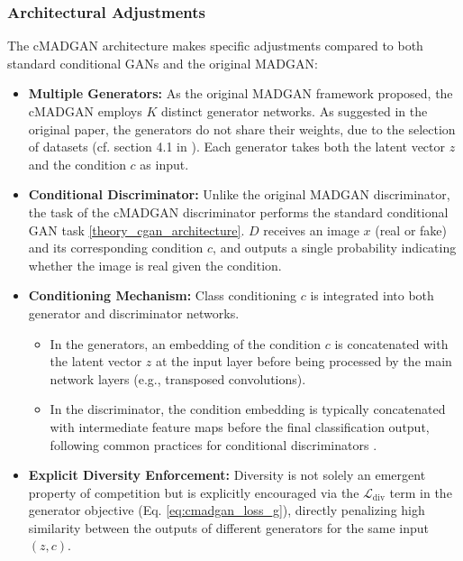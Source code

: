 \subsubsection{Architectural Adjustments}
\label{theory_cmadgan_architecture}

The cMADGAN architecture makes specific adjustments compared to both standard conditional GANs and the original MADGAN:

\begin{itemize}
    \item \textbf{Multiple Generators:}
    As the original MADGAN framework proposed, the \\cMADGAN employs $K$ distinct generator networks. As suggested in the original paper, the generators do not share their weights, due to the selection of datasets (cf. section 4.1 in \cite{ghosh2018madgan}). Each generator takes both the latent vector $z$ and the condition $c$ as input.
    \item \textbf{Conditional Discriminator:}
    Unlike the original MADGAN discriminator, the task of the cMADGAN discriminator performs the standard conditional GAN task \ref{theory_cgan_architecture}. $D$ receives an image $x$ (real or fake) and its corresponding condition $c$, and outputs a single probability indicating whether the image is real given the condition.
    \item \textbf{Conditioning Mechanism:} Class conditioning $c$ is integrated into both generator and discriminator networks.
        \begin{itemize}
            \item In the generators, an embedding of the condition $c$ is concatenated with the latent vector $z$ at the input layer before being processed by the main network layers (e.g., transposed convolutions).
            \item In the discriminator, the condition embedding is typically concatenated with intermediate feature maps before the final classification output, following common practices for conditional discriminators \cite{mirza2014conditionalgenerativeadversarialnets}.
        \end{itemize}
    \item \textbf{Explicit Diversity Enforcement:} Diversity is not solely an emergent property of competition but is explicitly encouraged via the $\mathcal{L}_{\text{div}}$ term in the generator objective (Eq. \ref{eq:cmadgan_loss_g}), directly penalizing high similarity between the outputs of different generators for the same input $(z, c)$.
\end{itemize}

